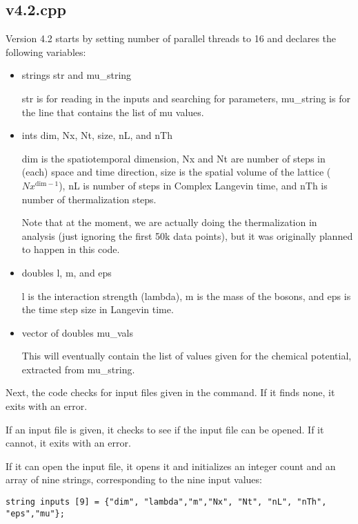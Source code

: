 \documentclass[../../RotatingBosons.tex]{subfiles}
\begin{document}
\subsection{\label{aartsmain}v4.2.cpp}
\lstset{language=c++}
Version 4.2 starts by setting number of parallel threads to 16 and declares the following variables: 
\begin{itemize}
\item strings str and mu\_string 

str is for reading in the inputs and searching for parameters, mu\_string is for the line that contains the list of mu values.

\item ints dim, Nx, Nt, size, nL, and nTh

dim is the spatiotemporal dimension, Nx and Nt are number of steps in (each) space and time direction, size is the spatial volume of the lattice ($Nx^{\text{dim}-1}$), nL is number of steps in Complex Langevin time, and nTh is number of thermalization steps.

Note that at the moment, we are actually doing the thermalization in analysis (just ignoring the first 50k data points), but it was originally planned to happen in this code.

\item doubles l, m, and eps

l is the interaction strength (lambda), m is the mass of the bosons, and eps is the time step size in Langevin time.

\item vector of doubles mu\_vals

This will eventually contain the list of values given for the chemical potential, extracted from mu\_string.
\end{itemize}

Next, the code checks for input files given in the command. If it finds none, it exits with an error. 

If an input file is given, it checks to see if the input file can be opened. If it cannot, it exits with an error.

If it can open the input file, it opens it and initializes an integer count and an array of nine strings, corresponding to the nine input values:

\begin{lstlisting} 
string inputs [9] = {"dim", "lambda","m","Nx", "Nt", "nL", "nTh", "eps","mu"}; 
\end{lstlisting}
\end{document}
